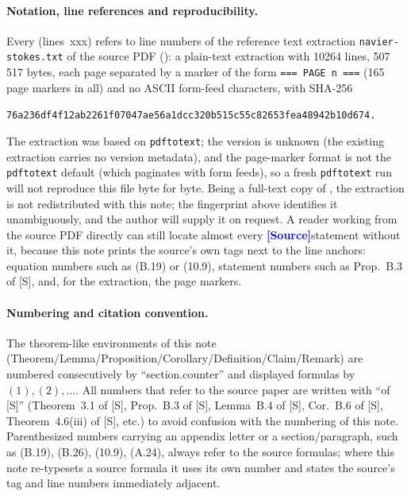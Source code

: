 \documentclass[11pt,a4paper]{article}
\theoremstyle{definition}
\theoremstyle{remark}
\newcommand{\lnos}[1]{(lines~#1)}
\newcommand{\ORIG}{\textcolor{blue}{\textbf{[Source]}}}
\begin{document}
\paragraph{Notation, line references and reproducibility.}
Every \lnos{xxx} refers to line numbers of the reference text extraction \nolinkurl{navier-stokes.txt}
of the source PDF (\cite{source}): a plain-text extraction with 10264 lines, 507\,517 bytes, each page
separated by a marker of the form \nolinkurl{=== PAGE n ===} (165 page markers in all) and no ASCII
form-feed characters, with SHA-256
\begin{center}
\texttt{76a236df4f12ab2261f07047ae56a1dcc320b515c55c82653fea48942b10d674.}
\end{center}
The extraction was based on \texttt{pdftotext}; the version is unknown (the existing extraction carries
no version metadata), and the page-marker format is not the \texttt{pdftotext} default (which paginates
with form feeds), so a fresh \texttt{pdftotext} run will not reproduce this file byte for byte.
Being a full-text copy of \cite{source}, the extraction is not redistributed with this note; the
fingerprint above identifies it unambiguously, and the author will supply it on request.
A reader working from the source PDF directly can still locate almost every \ORIG statement without it,
because this note prints the source's own tags next to the line anchors: equation numbers such as
(B.19) or (10.9), statement numbers such as Prop.~B.3 of [S], and, for the extraction, the page markers.

\paragraph{Numbering and citation convention.}
The theorem-like environments of this note (Theorem/Lemma/Proposition/Corollary/Definition/Claim/Remark)
are numbered consecutively by ``section.counter'' and displayed formulas by $(1),(2),\dots$.
All numbers that refer to the source paper are written with ``of [S]''
(Theorem~3.1 of [S], Prop.~B.3 of [S], Lemma~B.4 of [S], Cor.~B.6 of [S], Theorem~4.6(iii) of [S], etc.)
to avoid confusion with the numbering of this note. Parenthesized numbers carrying an appendix letter
or a section/paragraph, such as (B.19), (B.26), (10.9), (A.24), always refer to the source formulas;
where this note re-typesets a source formula it uses its own number and states the source's tag and
line numbers immediately adjacent.
\end{document}
